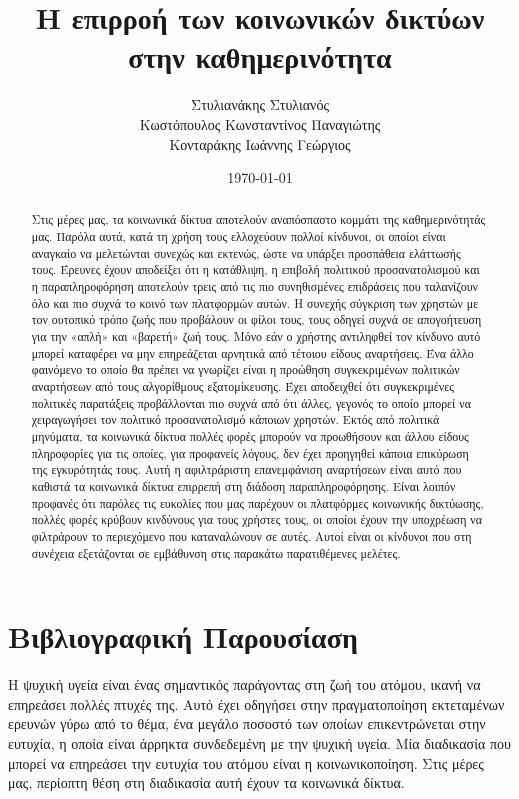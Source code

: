 \documentclass{article}
\title{Η επιρροή των κοινωνικών δικτύων στην καθημερινότητα}
\author{Στυλιανάκης Στυλιανός \\
Κωστόπουλος Κωνσταντίνος Παναγιώτης \\
Κονταράκης Ιωάννης Γεώργιος
}
\date{\today}
\begin{document}
\maketitle  
\begin{abstract}
Στις μέρες μας, τα κοινωνικά δίκτυα αποτελούν αναπόσπαστο κομμάτι της καθημερινότητάς μας. Παρόλα αυτά, κατά τη χρήση τους ελλοχεύουν πολλοί κίνδυνοι, οι οποίοι είναι αναγκαίο να μελετώνται συνεχώς και εκτενώς, ώστε να υπάρξει προσπάθεια ελάττωσής τους. Έρευνες έχουν αποδείξει ότι η κατάθλιψη, η επιβολή πολιτικού προσανατολισμού και η παραπληροφόρηση αποτελούν τρεις από τις πιο συνηθισμένες επιδράσεις που ταλανίζουν όλο και πιο συχνά το κοινό των πλατφορμών αυτών. Η συνεχής σύγκριση των χρηστών με τον ουτοπικό τρόπο ζωής που προβάλουν οι φίλοι τους, τους οδηγεί συχνά σε απογοήτευση για την «απλή» και «βαρετή» ζωή τους. Μόνο εάν ο χρήστης αντιληφθεί τον κίνδυνο αυτό μπορεί καταφέρει να μην επηρεάζεται αρνητικά από τέτοιου είδους αναρτήσεις. Ένα άλλο φαινόμενο το οποίο θα πρέπει να γνωρίζει είναι η προώθηση συγκεκριμένων πολιτικών αναρτήσεων από τους αλγορίθμους εξατομίκευσης. Έχει αποδειχθεί ότι συγκεκριμένες πολιτικές παρατάξεις προβάλλονται πιο συχνά από ότι άλλες, γεγονός το οποίο μπορεί να χειραγωγήσει τον πολιτικό προσανατολισμό κάποιων χρηστών. Εκτός από πολιτικά μηνύματα, τα κοινωνικά δίκτυα πολλές φορές μπορούν να προωθήσουν και άλλου είδους πληροφορίες για τις οποίες, για προφανείς λόγους, δεν έχει προηγηθεί κάποια επικύρωση της εγκυρότητάς τους. Αυτή η αφιλτράριστη επανεμφάνιση αναρτήσεων είναι αυτό που καθιστά τα κοινωνικά δίκτυα επιρρεπή στη διάδοση παραπληροφόρησης. Είναι λοιπόν προφανές ότι παρόλες τις ευκολίες που μας παρέχουν οι πλατφόρμες κοινωνικής δικτύωσης, πολλές φορές κρύβουν κινδύνους για τους χρήστες τους, οι οποίοι έχουν την υποχρέωση να φιλτράρουν το περιεχόμενο που καταναλώνουν σε αυτές. Αυτοί είναι οι κίνδυνοι που στη συνέχεια εξετάζονται σε εμβάθυνση στις παρακάτω παρατιθέμενες μελέτες.
\end{abstract}
\clearpage 
\tableofcontents
\section{Βιβλιογραφική Παρουσίαση}
Η ψυχική υγεία είναι ένας σημαντικός παράγοντας στη ζωή του ατόμου, ικανή να επηρεάσει πολλές πτυχές της. Αυτό έχει οδηγήσει στην πραγματοποίηση εκτεταμένων ερευνών γύρω από το θέμα, ένα μεγάλο ποσοστό των οποίων επικεντρώνεται στην ευτυχία, η οποία είναι άρρηκτα συνδεδεμένη με την ψυχική υγεία. Μία διαδικασία που μπορεί να επηρεάσει την ευτυχία του ατόμου είναι η κοινωνικοποίηση. Στις μέρες μας, περίοπτη θέση στη διαδικασία αυτή έχουν τα κοινωνικά δίκτυα.
\end{document}

